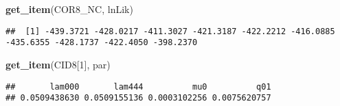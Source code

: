 \documentclass[
]{article}
\newenvironment{Shaded}{\begin{snugshade}}{\end{snugshade}}
\newcommand{\DecValTok}[1]{\textcolor[rgb]{0.00,0.00,0.81}{#1}}
\newcommand{\FunctionTok}[1]{\textcolor[rgb]{0.13,0.29,0.53}{\textbf{#1}}}
\newcommand{\NormalTok}[1]{#1}
\newcommand{\SpecialCharTok}[1]{\textcolor[rgb]{0.81,0.36,0.00}{\textbf{#1}}}
\newcommand{\StringTok}[1]{\textcolor[rgb]{0.31,0.60,0.02}{#1}}
\begin{document}
\begin{Shaded}
\begin{Highlighting}[]
\FunctionTok{get\_item}\NormalTok{(COR8\_NC, }\StringTok{\textquotesingle{}lnLik\textquotesingle{}}\NormalTok{)}
\end{Highlighting}
\end{Shaded}

\begin{verbatim}
##  [1] -439.3721 -428.0217 -411.3027 -421.3187 -422.2212 -416.0885 -435.6355 -428.1737 -422.4050 -398.2370
\end{verbatim}

\begin{Shaded}
\begin{Highlighting}[]
\FunctionTok{get\_item}\NormalTok{(CID8[}\DecValTok{1}\NormalTok{], }\StringTok{\textquotesingle{}par\textquotesingle{}}\NormalTok{)}
\end{Highlighting}
\end{Shaded}

\begin{verbatim}
##       lam000       lam444          mu0          q01 
## 0.0509438630 0.0509155136 0.0003102256 0.0075620757
\end{verbatim}

\begin{Shaded}
\end{Shaded}
\end{document}
